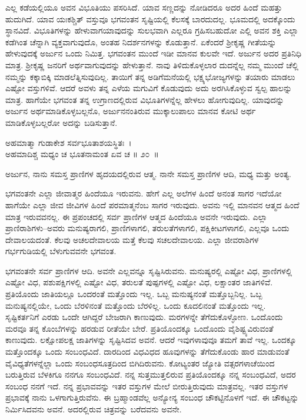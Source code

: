 ಎಲ್ಲ ಕಡೆಯಲ್ಲಿಯೂ ಅವನ ವಿಭೂತಿಯು ಪಸರಿಸಿದೆ. ಯಾವ ಸಣ್ಣದನ್ನು ನೋಡಿದರೂ ಅದರ ಹಿಂದೆ ಮಹತ್ತು ಹುದುಗಿದೆ. ಯಾವ ಯಃಕಶ್ಚಿತ್ ವಸ್ತುವೂ ಭಗವಂತನ ಸೃಷ್ಟಿಯಲ್ಲಿ ಕೆಲಸಕ್ಕೆ ಬಾರದುದಲ್ಲ. ಭೂಮದಲ್ಲಿ ಅದಕ್ಕೊಂದು ಸ್ಥಾನವಿದೆ. ವಿಭೂತಿಗಳನ್ನು ಹೇಳುವಾಗ\break ಯಾವುದನ್ನು ಸುಲಭವಾಗಿ ಎಲ್ಲರೂ ಗ್ರಹಿಸಬಹುದೋ ಎಲ್ಲಿ ಅವನ ಶಕ್ತಿ ಎಲ್ಲಾ ಕಡೆಗಿಂತ ಚೆನ್ನಾಗಿ ವ್ಯಕ್ತವಾಗುವುದೊ, ಅಂತಹ ನಿದರ್ಶನಗಳನ್ನು ಕೊಡುತ್ತಾನೆ. ಏಕೆಂದರೆ ಶ‍್ರೀಕೃಷ್ಣ ಗೀತೆಯನ್ನು ಹೇಳುವುದಕ್ಕೆ ಅರ್ಜುನ ಒಂದು ನಿಮಿತ್ತ. ಭಗವಂತನ ಮುಂದೆ ಇಡೀ ಮಾನವ ಕುಲವೇ ಇದೆ. ಅರ್ಜುನ ಅದರ ಪ್ರತಿನಿಧಿ ಮಾತ್ರ. ಶ‍್ರೀಕೃಷ್ಣ ಜನರಿಗೆ ಅರ್ಥವಾಗುವುದನ್ನು ಹೇಳುತ್ತಾನೆ. ನಾವು ತಿಳಿದುಕೊಳ್ಳಲಾರ ದುದನ್ನೆಲ್ಲ ನಮ್ಮ ಮುಂದೆ ಚೆಲ್ಲಿ ನಮ್ಮನ್ನು ಕಕ್ಕಾಬಿಕ್ಕಿ ಮಾಡಲೆತ್ನಿಸುವುದಿಲ್ಲ. ತಾಯಿಗೆ ತನ್ನ ಅಡಿಗೆಮನೆಯಲ್ಲಿ ಭಕ್ಷ್ಯಭೋಜ್ಯಗಳನ್ನು ತಯಾರು ಮಾಡಲು ಎಷ್ಟೋ ವಸ್ತುಗಳಿವೆ. ಆದರೆ ಅವಳು ತನ್ನ ಎಳೆಯ ಮಗುವಿಗೆ ಕೊಡುವುದು ಅದು ಅರಗಿಸಿಕೊಳ್ಳುವ ಸ್ವಲ್ಪ ಹಾಲನ್ನು ಮಾತ್ರ. ಹಾಗೆಯೇ ಭಗವಂತ ತನ್ನ ಉಗ್ರಾಣದಲ್ಲಿರುವ ವಿಭೂತಿಗಳನ್ನೆಲ್ಲ ಹೇಳಲು ಹೋಗುವುದಿಲ್ಲ. ಯಾವುದನ್ನು ಅರ್ಜುನ ಅರ್ಥಮಾಡಿಕೊಳ್ಳಬಲ್ಲನೊ, ಅರ್ಜುನನಂತಿರುವ ಮುಕ್ಕಾಲುಪಾಲು ಮಾನವ ಕೋಟಿ ಅರ್ಥ ಮಾಡಿಕೊಳ್ಳಬಲ್ಲರೋ ಅದನ್ನು ಬಡಿಸುತ್ತಾನೆ. 

\begin{shloka}
ಅಹಮಾತ್ಮಾ ಗುಡಾಕೇಶ ಸರ್ವಭೂತಾಶಯಸ್ಥಿತಃ~।\\ಅಹಮಾದಿಶ್ಚ ಮಧ್ಯಂ ಚ ಭೂತನಾಮಂತ ಏವ ಚ \hfill॥ ೨೦~॥
\end{shloka}

\begin{artha}
ಅರ್ಜುನ, ನಾನು ಸಮಸ್ತ ಪ್ರಾಣಿಗಳ ಹೃದಯದಲ್ಲಿರುವ ಆತ್ಮ. ನಾನೇ ಸಮಸ್ತ ಪ್ರಾಣಿಗಳ ಆದಿ, ಮಧ್ಯ ಮತ್ತು ಅಂತ್ಯ.
\end{artha}

ಭಗವಂತನೇ ಎಲ್ಲಾ ಜೀವಾತ್ಮರ ಹಿಂದೆಯೂ ಇರುವನು. ಹೇಗೆ ಎಲ್ಲ ಅಲೆಗಳ ಹಿಂದೆ ಅನಂತ ಸಾಗರ ಇದೆಯೋ ಹಾಗೆಯೇ ಎಲ್ಲಾ ಜೀವ ಜೀವಿಗಳ ಹಿಂದೆ ಪರಮಾತ್ಮನೆಂಬ ಸಾಗರ ಇರುವುದು. ಅವನು ಇಲ್ಲಿ ಮಾನವನ ಆತ್ಮದ ಹಿಂದೆ ಮಾತ್ರ ಇರುವವನಲ್ಲ. ಈ ಪ್ರಪಂಚದಲ್ಲಿ ಸರ್ವ ಪ್ರಾಣಿಗಳ ಆತ್ಮದ ಹಿಂದೆಯೂ ಅವನೇ ಇರುವುದು. ಎಲ್ಲಾ ಪ್ರಾಣಿರಾಶಿಗಳು–ಅವರು ಮನುಷ್ಯರಾಗಲಿ, ಪ್ರಾಣಿಗಳಾಗಲಿ, ತರುಲತೆಗಳಾಗಲಿ, ಪಕ್ಷಿಕೀಟಗಳಾಗಲಿ, ಎಲ್ಲವೂ ಒಂದು ದೇವಾಲಯದಂತೆ. ಕೆಲವು ಅಚಲದೇವಾಲಯ ಮತ್ತೆ ಕೆಲವು ಸಚಲದೇವಾಲಯ. ಎಲ್ಲಾ ಜೀವರಾಶಿಗಳ ಗರ್ಭಗುಡಿಯಲ್ಲಿ ಬೆಳುಗುವವನೇ ಭಗವಂತ.

ಭಗವಂತನೇ ಸರ್ವ ಪ್ರಾಣಿಗಳ ಆದಿ. ಅವನೇ ಎಲ್ಲವನ್ನೂ ಸೃಷ್ಟಿಸಿರುವನು. ಮನುಷ್ಯರಲ್ಲಿ ಎಷ್ಟೋ ವಿಧ, ಪ್ರಾಣಿಗಳಲ್ಲಿ ಎಷ್ಟೋ ವಿಧ, ಪಶುಪಕ್ಷಿಗಳಲ್ಲಿ ಎಷ್ಟೋ ವಿಧ, ತರುಲತೆ ಪುಷ್ಪಗಳಲ್ಲಿ ಎಷ್ಟೋ ವಿಧ, ಲಕ್ಷಾಂತರ ಜಾತಿಗಳಿವೆ. ಪ್ರತಿಯೊಂದು ಜಾತಿಯಲ್ಲೂ ಒಂದರಂತೆ ಮತ್ತೊಂದು ಇಲ್ಲ. ಒಬ್ಬ ಮನುಷ್ಯನಂತೆ ಮತ್ತೊಬ್ಬನಿಲ್ಲ. ಒಬ್ಬ ಮನುಷ್ಯನಲ್ಲಿಯೇ, ಒಂದು ಬೆರಳಿನಂತೆ ಮತ್ತೊಂದು ಬೆರಳಿಲ್ಲ. ಒಂದು ಕೂದಲಿನಂತೆ ಮತ್ತೊಂದು ಇಲ್ಲ. ಸೃಷ್ಟಿಕರ್ತನಿಗೆ ಎರಡು ಒಂದೇ ಆಗಿದ್ದರೆ ಬೇಜರಾಗಿ ಕಾಣುವುದು. ಮರಗಳನ್ನೇ ತೆಗೆದುಕೊಳ್ಳೋಣ. ಒಂದೊಂದು ಮರವೂ ತನ್ನ ಕೊಂಬೆಗಳನ್ನು ಹರಡುವ ರೀತೆಯೇ ಬೇರೆ. ಪ್ರತಿಯೊಂದಕ್ಕೂ ಒಂದೊಂದು ವೈಶಿಷ್ಟ್ಯವಿರುವಂತೆ ಕಾಣುವುದು. ಲಕ್ಷೋಪಲಕ್ಷ ಜಾತಿಗಳನ್ನು ಸೃಷ್ಟಿಸಿದವ ಅವನೆ. ಆದರೆ ಇವುಗಳಾವುವೂ ತಮಗೆ ತಾವೆ ಇಲ್ಲ. ಒಂದಕ್ಕೂ ಮತ್ತೊಂದಕ್ಕೂ ಒಂದು ಸಂಬಂಧವಿದೆ. ದಾರದಿಂದ ವಿಧವಿಧದ ಹೂವುಗಳನ್ನು ತೆಗೆದುಕೊಂಡು ಹಾರ ಮಾಡುವಂತೆ ವೈವಿಧ್ಯತೆಗಳನ್ನೆಲ್ಲಾ ಒಂದು ಸಂಬಂಧಸೂತ್ರದಿಂದ ಬಿಗಿದಿರುವನು. ಕೋಟ್ಯಂತರ ಜ್ಯೋತಿ ವತ್ಸರಗಳಾಚೆಯಿಂದ ಬರುತ್ತಿರುವ ಬೆಳಕಿಗೂ ನನಗೂ ಸಂಬಂಧವಿದೆ. ನನ್ನ ಸುತ್ತಮುತ್ತಲಿರುವ ಪ್ರತಿಯೊಂದಕ್ಕೂ ನನ್ನ ಸಂಬಂಧವಿದೆ, ಅದರ ಸಂಬಂಧ ನನಗೆ ಇದೆ. ನನ್ನ ಪ್ರಭಾವವನ್ನು ಇತರ ವಸ್ತುಗಳ ಮೇಲೆ ಬೀರುತ್ತಿರುವುದು ಮಾತ್ರವಲ್ಲ. ಇತರ ವಸ್ತುಗಳ ಪ್ರಭಾವಕ್ಕೆ ನಾನು ಒಳಗಾಗುತ್ತಿರುವೆನು. ಈ ಬ್ರಹ್ಮಾಂಡವೆಲ್ಲ ಅನ್ಯೋನ್ಯ ಸಂಬಂಧ ಚೌಕಟ್ಟಿನೊಳಗೆ ಇದೆ. ಈ ಚೌಕಟ್ಟನ್ನು ನಿರ್ಮಿಸಿದವನು ಅವನೆ. ಅದರಲ್ಲಿರುವ ಚಿತ್ರವನ್ನು ಬರೆದವನು ಅವನೇ.

